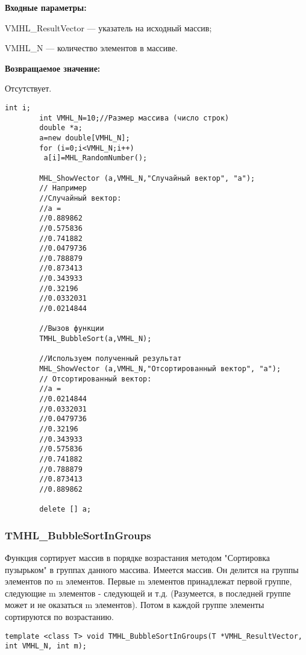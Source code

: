\documentclass[a4paper,12pt]{article}
\begin{document}
\textbf{Входные параметры:}
 
VMHL\_ResultVector --- указатель на исходный массив;
 
VMHL\_N --- количество элементов в массиве.

\textbf{Возвращаемое значение:}

Отсутствует.


\begin{lstlisting}[label=code_use_TMHL_BubbleSort,caption=Пример использования]
        int i;
        int VMHL_N=10;//Размер массива (число строк)
        double *a;
        a=new double[VMHL_N];
        for (i=0;i<VMHL_N;i++)
         a[i]=MHL_RandomNumber();

        MHL_ShowVector (a,VMHL_N,"Случайный вектор", "a");
        // Например
        //Случайный вектор:
        //a =
        //0.889862
        //0.575836
        //0.741882
        //0.0479736
        //0.788879
        //0.873413
        //0.343933
        //0.32196
        //0.0332031
        //0.0214844

        //Вызов функции
        TMHL_BubbleSort(a,VMHL_N);

        //Используем полученный результат
        MHL_ShowVector (a,VMHL_N,"Отсортированный вектор", "a");
        // Отсортированный вектор:
        //a =
        //0.0214844
        //0.0332031
        //0.0479736
        //0.32196
        //0.343933
        //0.575836
        //0.741882
        //0.788879
        //0.873413
        //0.889862

        delete [] a;
\end{lstlisting}

\subsubsection{TMHL\_BubbleSortInGroups}\label{TMHL_BubbleSortInGroups}

Функция сортирует массив в порядке возрастания методом "Сортировка пузырьком" в группах данного массива. Имеется массив. Он делится на группы элементов по m элементов. Первые m элементов принадлежат первой группе, следующие m элементов - следующей и т.д. (Разумеется, в последней группе может и не оказаться m элементов). Потом в каждой группе элементы сортируются по возрастанию.


\begin{lstlisting}[label=code_syntax_TMHL_BubbleSortInGroups,caption=Синтаксис]
template <class T> void TMHL_BubbleSortInGroups(T *VMHL_ResultVector, int VMHL_N, int m);
\end{lstlisting}
\end{document}
